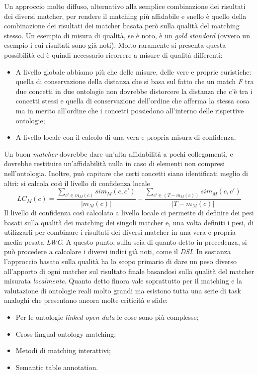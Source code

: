 \documentclass[11pt]{article}
\begin{document}
Un approccio molto diffuso, alternativo alla semplice combinazione dei risultati dei diversi matcher, per rendere il matching più affidabile e snello è quello della combinazione dei risultati dei matcher basata però sulla qualità del matching stesso. Un esempio di misura di qualità, se è noto, è un \textit{gold standard} (ovvero un esempio i cui risultati sono già noti). Molto raramente si presenta questa possibilità ed è quindi necessario ricorrere a misure di qualità differenti:
\begin{itemize}
\item A livello globale abbiamo più che delle misure, delle vere e proprie euristiche: quella di conservazione della distanza che si basa sul fatto che un match \textit{F} tra due concetti in due ontologie non dovrebbe distorcere la distanza che c'è tra i concetti stessi e quella di conservazione dell'ordine che afferma la stessa cosa ma in merito all'ordine che i concetti possiedono all'interno delle rispettive ontologie;
\item A livello locale con il calcolo di una vera e propria misura di confidenza.
\end{itemize}
Un buon \textit{matcher} dovrebbe dare un'alta affidabilità a pochi collegamenti, e dovrebbe restituire un'affidabilità nulla in caso di elementi non compresi nell'ontologia.
Inoltre, può capitare che certi concetti siano identificati meglio di altri: si calcola così il livello di confidenza locale
\begin{equation*}
  LC_M(c) = \frac{\sum_{c' \in m_M(c)}sim_M(c, c')}{|m_M(c)|} - \frac{\sum_{c' \in (T - m_M(c))}sim_M(c, c')}{|T - m_M(c)|}
\end{equation*}
Il livello di confidenza così calcolato a livello locale ci permette di definire dei pesi basati sulla qualità dei matching dei singoli matcher e, una volta definiti i pesi, di utilizzarli per combinare i risultati dei diversi matcher in una vera e propria media pesata \textit{LWC}. A questo punto, sulla scia di quanto detto in precedenza, si può procedere a calcolare i diversi indici già noti, come il \textit{DSI}. In sostanza l'approccio basato sulla qualità ha lo scopo primario di dare un peso diverso all'apporto di ogni matcher sul risultato finale basandosi sulla qualità del matcher misurata \textit{localmente}.
\newline
\newline
Quanto detto finora vale soprattutto per il matching e la valutazione di ontologie reali molto grandi ma esistono tutta una serie di task analoghi che presentano ancora molte criticità e sfide:
\begin{itemize}
\item Per le ontologie \textit{linked open data} le cose sono più complesse;
\item Cross-lingual ontology matching;
\item Metodi di matching interattivi;
\item Semantic table annotation.
\end{itemize} 
\end{document}
